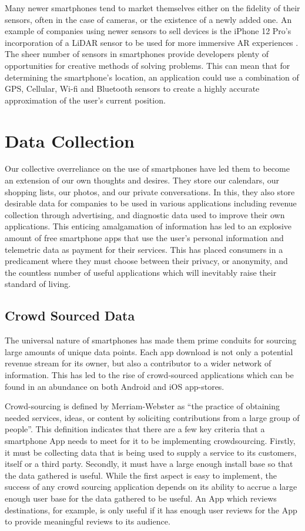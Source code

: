 Many newer smartphones tend to market themselves either on the fidelity of their sensors, often in the case of cameras, or the existence of a newly added one. An example of companies using newer sensors to sell devices is the iPhone 12 Pro’s incorporation of a LiDAR sensor to be used for more immersive AR experiences \cite{Stein2020}. The sheer number of sensors in smartphones provide developers plenty of opportunities for creative methods of solving problems. This can mean that for determining the smartphone’s location, an application could use a combination of GPS, Cellular, Wi-fi and Bluetooth sensors to create a highly accurate approximation of the user’s current position.

\section{Data Collection}
Our collective overreliance on the use of smartphones have led them to become an extension of our own thoughts and desires. They store our calendars, our shopping lists, our photos, and our private conversations. In this, they also store desirable data for companies to be used in various applications including revenue collection through advertising, and diagnostic data used to improve their own applications. This enticing amalgamation of information has led to an explosive amount of free smartphone apps that use the user’s personal information and telemetric data as payment for their services. This has placed consumers in a predicament where they must choose between their privacy, or anonymity, and the countless number of useful applications which will inevitably raise their standard of living. 

\subsection{Crowd Sourced Data}
The universal nature of smartphones has made them prime conduits for sourcing large amounts of unique data points. Each app download is not only a potential revenue stream for its owner, but also a contributor to a wider network of information. This has led to the rise of crowd-sourced applications which can be found in an abundance on both Android and iOS app-stores.

Crowd-sourcing is defined by Merriam-Webster as “the practice of obtaining needed services, ideas, or content by soliciting contributions from a large group of people”\cite{Merriam-Webster}. This definition indicates that there are a few key criteria that a smartphone App needs to meet for it to be implementing crowdsourcing. Firstly, it must be collecting data that is being used to supply a service to its customers, itself or a third party. Secondly, it must have a large enough install base so that the data gathered is useful. While the first aspect is easy to implement, the success of any crowd sourcing application depends on its ability to accrue a large enough user base for the data gathered to be useful. An App which reviews destinations, for example, is only useful if it has enough user reviews for the App to provide meaningful reviews to its audience. 

